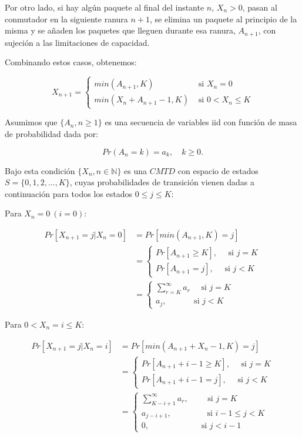 \documentclass[
]{book}
\theoremstyle{definition}
\theoremstyle{definition}
\theoremstyle{definition}
\theoremstyle{definition}
\theoremstyle{remark}
\begin{document}
Por otro lado, si hay algún paquete al final del instante \(n\), \(X_n > 0\), pasan al conmutador en la siguiente ranura \(n+1\), se elimina un paquete al principio de la misma y se añaden los paquetes que lleguen durante esa ranura, \(A_{n+1}\), con sujeción a las limitaciones de capacidad.

Combinando estos casos, obtenemos:

\begin{equation*}
X_{n+1} =  
\begin{cases}
min(A_{n+1}, K) & \text{ si } X_n = 0\\
min(X_n + A_{n+1} - 1, K) & \text{ si } 0 < X_n \leq K
\end{cases}
\end{equation*}

Asumimos que \(\{A_n, n \geq 1\}\) es una secuencia de variables iid con función de masa de probabilidad dada por:

\[Pr(A_n = k) = a_k, \quad k \geq 0.\]

Bajo esta condición \(\{X_n, n \in \mathbb{N}\}\) es una \(CMTD\) con espacio de estados \(S = \{0, 1, 2,..., K\}\), cuyas probabilidades de transición vienen dadas a continuación para todos los estados \(0 \leq j \leq K\):

Para \(X_n=0 \ (i=0)\):

\[\begin{array}{ll}
Pr[X_{n+1} = j | X_n = 0] & = Pr[min(A_{n+1}, K) = j]\\
& = \begin{cases}
Pr[A_{n+1} \geq K], \quad \text{ si } j=K\\
Pr[A_{n+1}=j], \quad \text{ si } j<K
\end{cases} \\
&= \begin{cases}
\sum_{r=K}^{\infty} a_r \quad \text{ si } j=K\\
a_j, \qquad \quad \text{ si } j<K
\end{cases}
\end{array}\]

Para \(0< X_n=i \leq K\):

\[\begin{array}{ll}
Pr[X_{n+1} = j | X_n = i] & = Pr[min(A_{n+1}+X_n-1, K) = j]\\
& = \begin{cases}
Pr[A_{n+1} +i-1 \geq K], \quad \text{ si } j=K\\
Pr[A_{n+1}+i-1=j], \quad \text{ si } j<K
\end{cases} \\
& = \begin{cases}
\sum_{K-i+1}^{\infty} a_r, \qquad \text{ si } j=K\\
a_{j-i+1}, \qquad \qquad \text{ si } i-1 \leq j<K\\
0, \qquad \qquad \qquad  \text{ si } j<i-1
\end{cases}
\end{array}\]
\end{document}
